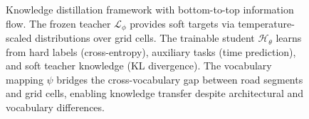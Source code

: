\begin{figure}[t]
    \caption{Knowledge distillation framework with bottom-to-top information flow. The frozen teacher $\mathcal{L}_\phi$ provides soft targets via temperature-scaled distributions over grid cells. The trainable student $\mathcal{H}_\theta$ learns from hard labels (cross-entropy), auxiliary tasks (time prediction), and soft teacher knowledge (KL divergence). The vocabulary mapping $\psi$ bridges the cross-vocabulary gap between road segments and grid cells, enabling knowledge transfer despite architectural and vocabulary differences.}
    \label{fig:distillation-framework}
\end{figure}
